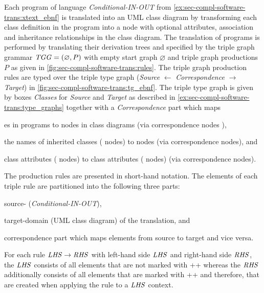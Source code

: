 \begin{example}
\label{ex:sec-compl-software-trans:trans}
Each program of language \textit{Conditional-IN-OUT} from \cref{ex:sec-compl-software-trans:xtext_ebnf} is translated into an UML class diagram by transforming each class definition in the program into a  node with optional attributes, association and inheritance relationships in the class diagram.
The translation of programs is performed by translating their derivation trees and specified by the triple graph grammar $\mathit{TGG}=(\varnothing, P)$ with empty start graph $\varnothing$ and triple graph productions $P$ as given in \cref{fig:sec-compl-software-trans:rules}.
The triple graph production rules are typed over the triple type graph (\textit{Source} $\gets$ \textit{Correspondence} $\to$ \textit{Target}) in \cref{fig:sec-compl-software-trans:tg_ebnf}.
The triple type graph is given by boxes \textit{Classes} for \textit{Source} and \textit{Target} as described in \cref{ex:sec-compl-software-trans:type_graphs} together with a \textit{Correspondence} part which maps 
\begin{enumerate*}
\item {}es in programs to  nodes in class diagrams (via correspondence nodes ),
\item the names of inherited classes ( nodes) to  nodes (via  correspondence nodes), and
\item class attributes ( nodes) to class attributes ( nodes) (via  correspondence nodes).
\end{enumerate*}
The production rules are presented in short-hand notation.
The elements of each triple rule are partitioned into the following three parts:
\begin{enumerate*}
\item source- (\textit{Conditional-IN-OUT}),
\item target-domain (UML class diagram) of the translation, and
\item correspondence part which maps elements from source to target and vice versa.
\end{enumerate*} 
For each rule $\mathit{LHS} \to \mathit{RHS}$ with left-hand side $\mathit{LHS}$ and right-hand side $\mathit{RHS}$, the $\mathit{LHS}$ consists of all elements that are not marked with \textsf{++} whereas the $\mathit{RHS}$ additionally consists of all elements that are marked with \textsf{++} and therefore, that are created when applying the rule to a $\mathit{LHS}$ context.

\end{example}
